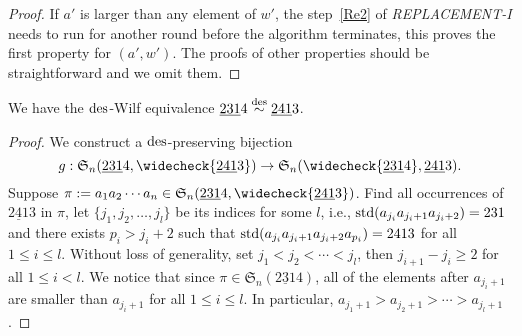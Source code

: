 \begin{proof}
  If $a'$ is larger than any element of $w'$, the step~\ref{Re2} of \textit{REPLACEMENT-I} needs to run for another round before the algorithm terminates, this proves the first property for $(a',w')$. The proofs of other properties should be straightforward and we omit them.
\end{proof}


\begin{theorem}
  We have the $\mathrm{des}$-Wilf equivalence $\underline{231}4 \overset{\mathrm{des}}{\sim }\underline{241}3$. \label{231-4--241-3}
\end{theorem}

\begin{proof}
  We construct a $\mathrm{des}$-preserving bijection
  $$g: \S_n(\underline{231}4,\widecheck{\underline{241}3}) \to \S_n(\widecheck{\underline{231}4},\underline{241}3).$$
  Suppose $\pi:=a_1a_2\cdots a_n\in \S_n(\underline{231}4,\widecheck{\underline{241}3})$. 
  Find all occurrences of $\underline{241}3$ in $\pi$, let $\{j_1,j_2,\ldots,j_l\}$
  be its indices for some $l$, i.e., $\mathrm{std}(a_{j_i}a_{j_i+1}a_{j_i+2})=231$ and there exists $p_i>j_i+2$
  such that $\mathrm{std}(a_{j_i}a_{j_i+1}a_{j_i+2}a_{p_i})=2413$ for all $1\le i \le l$.
  Without loss of generality, set $j_1<j_2<\cdots<j_l$, then $j_{i+1}-j_i\ge 2$ for all $1\le i < l$.
  We notice that since $\pi \in \mathfrak{S}_n(\underline{231}4)$, all of the elements after $a_{j_i+1}$ are smaller than $a_{j_i+1}$ for all $1\le i \le l$. In particular, $a_{j_1+1}>a_{j_2+1}>\cdots>a_{j_l+1}$.
    

\end{proof}
